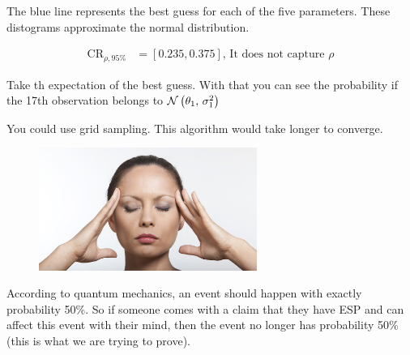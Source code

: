 \documentclass[12pt]{article}
\begin{document}
\begin{enumerate}
    The blue line represents the best guess for each of the five parameters. These distograms approximate the normal distribution. 


    \begin{align*}
        \text{CR}_{\rho, 95\%} &= [0.235, 0.375] \text{, It does not capture $\rho$}
    \end{align*}




    Take th expectation of the best guess. With that you can see the probability if the 17th observation belongs to $\mathcal{N}\left(\theta_1,\,\sigma^2_1\right)$


    You could use grid sampling. This algorithm would take longer to converge. 


\end{enumerate}


\begin{figure}[htp]
\centering
\includegraphics[width=2.8in]{esp.jpg}
\end{figure}

According to quantum mechanics, an event should happen with exactly probability 50\%. So if someone comes with a claim that they have ESP and can affect this event with their mind, then the event no longer has probability 50\% (this is what we are trying to prove).
\end{document}
